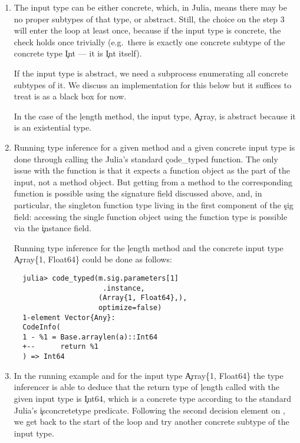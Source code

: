 \documentclass[sigplan,screen]{acmart}
\begin{document}
\begin{enumerate}
  \item The input type can be either concrete, which, in Julia, means there may
  be no proper subtypes of that type, or abstract. Still, the choice on the
  step 3 will enter the loop at least once, because if the input type is
  concrete, the check holds once trivially (e.g.\ there is exactly one concrete
  subtype of the concrete type \c{Int} --- it is \c{Int} itself).

  If the input type is abstract, we need a subprocess enumerating all concrete
  subtypes of it. We discuss an implementation for this below but it suffices to
  treat is as a black box for now. %

  In the case of the \c{length} method, the input type, \c{Array}, is abstract
  because it is an existential type.

  \item Running type inference for a given method and a given concrete input
  type is done through calling the Julia's standard \c{code\_typed} function.
  The only issue with the function is that it expects a function object as the
  part of the input, not a method object. But getting from a method to the
  corresponding function is possible using the signature field discussed above,
  and, in particular, the singleton function type living in the first component
  of the \c{sig} field: accessing the single function object using the function
  type is possible via the \c{instance} field.

  Running type inference for the \c{length} method and the concrete input type
  \c{Array\{1, Float64\}} could be done as follows:
\begin{verbatim}
  julia> code_typed(m.sig.parameters[1]
                     .instance,
                    (Array{1, Float64},),
                    optimize=false)
  1-element Vector{Any}:
  CodeInfo(
  1 - %1 = Base.arraylen(a)::Int64
  +--      return %1
  ) => Int64
\end{verbatim}

  \item In the running example and for the input type \c{Array\{1, Float64\}}
  the type inferencer is able to deduce that the return type of \c{length}
  called with the given input type is \c{Int64}, which is a concrete type
  according to the standard Julia's \c{isconcretetype} predicate.
  Following the second decision element on , we get back to
  the start of the loop and try another concrete subtype of the input type.
\end{enumerate}
\end{document}
